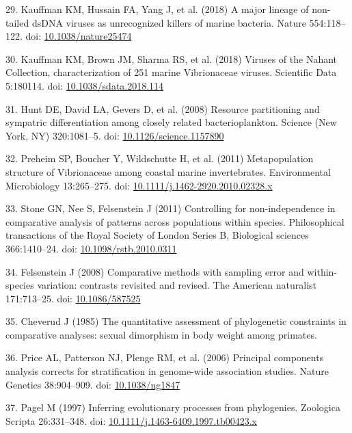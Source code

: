 \documentclass[12pt,twoside]{mitthesis-manusdown}
\begin{document}
\hypertarget{ref-Kauffman2018}{}
29. Kauffman KM, Hussain FA, Yang J, et al. (2018) A major lineage of
non-tailed dsDNA viruses as unrecognized killers of marine bacteria.
Nature 554:118--122. doi:
\href{https://doi.org/10.1038/nature25474}{10.1038/nature25474}

\hypertarget{ref-Kauffman2018a}{}
30. Kauffman KM, Brown JM, Sharma RS, et al. (2018) Viruses of the
Nahant Collection, characterization of 251 marine Vibrionaceae viruses.
Scientific Data 5:180114. doi:
\href{https://doi.org/10.1038/sdata.2018.114}{10.1038/sdata.2018.114}

\hypertarget{ref-Hunt2008}{}
31. Hunt DE, David LA, Gevers D, et al. (2008) Resource partitioning and
sympatric differentiation among closely related bacterioplankton.
Science (New York, NY) 320:1081--5. doi:
\href{https://doi.org/10.1126/science.1157890}{10.1126/science.1157890}

\hypertarget{ref-Preheim2011}{}
32. Preheim SP, Boucher Y, Wildschutte H, et al. (2011) Metapopulation
structure of Vibrionaceae among coastal marine invertebrates.
Environmental Microbiology 13:265--275. doi:
\href{https://doi.org/10.1111/j.1462-2920.2010.02328.x}{10.1111/j.1462-2920.2010.02328.x}

\hypertarget{ref-Stone2011}{}
33. Stone GN, Nee S, Felsenstein J (2011) Controlling for
non-independence in comparative analysis of patterns across populations
within species. Philosophical transactions of the Royal Society of
London Series B, Biological sciences 366:1410--24. doi:
\href{https://doi.org/10.1098/rstb.2010.0311}{10.1098/rstb.2010.0311}

\hypertarget{ref-Felsenstein2008}{}
34. Felsenstein J (2008) Comparative methods with sampling error and
within-species variation: contrasts revisited and revised. The American
naturalist 171:713--25. doi:
\href{https://doi.org/10.1086/587525}{10.1086/587525}

\hypertarget{ref-Cheverud1985}{}
35. Cheverud J (1985) The quantitative assessment of phylogenetic
constraints in comparative analyses: sexual dimorphism in body weight
among primates.

\hypertarget{ref-Price2006}{}
36. Price AL, Patterson NJ, Plenge RM, et al. (2006) Principal
components analysis corrects for stratification in genome-wide
association studies. Nature Genetics 38:904--909. doi:
\href{https://doi.org/10.1038/ng1847}{10.1038/ng1847}

\hypertarget{ref-PAGEL1997}{}
37. Pagel M (1997) Inferring evolutionary processes from phylogenies.
Zoologica Scripta 26:331--348. doi:
\href{https://doi.org/10.1111/j.1463-6409.1997.tb00423.x}{10.1111/j.1463-6409.1997.tb00423.x}
\end{document}
